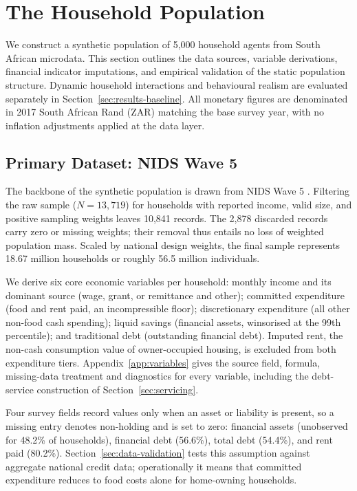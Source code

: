 \section{The Household Population}
\label{ch:population}

We construct a synthetic population of 5{,}000 household agents from South African microdata.
This section outlines the data sources, variable derivations, financial indicator imputations, and empirical validation of the static population structure.
Dynamic household interactions and behavioural realism are evaluated separately in Section~\ref{sec:results-baseline}.
All monetary figures are denominated in 2017 South African Rand (ZAR) matching the base survey year, with no inflation adjustments applied at the data layer.

\subsection{Primary Dataset: NIDS Wave 5}
\label{sec:backbone}

The backbone of the synthetic population is drawn from \ac{NIDS} Wave 5 \cite{nids_w5_2018}.
Filtering the raw sample ($N = 13,719$) for households with reported income, valid size, and
positive sampling weights leaves 10{,}841 records. The 2{,}878 discarded records carry zero or missing weights; their removal thus entails no loss of weighted population mass. Scaled by national design weights, the final sample represents 18.67 million households or roughly 56.5 million individuals.

We derive six core economic variables per household: monthly income and its dominant source (wage, grant, or remittance and other); committed expenditure (food and rent paid, an incompressible floor); discretionary expenditure (all other non-food cash spending); liquid savings (financial assets, winsorised at the 99th percentile); and traditional debt (outstanding financial debt).
Imputed rent, the non-cash consumption value of owner-occupied housing, is excluded from both expenditure tiers.
Appendix~\ref{app:variables} gives the source field, formula, missing-data treatment and diagnostics for every variable, including the debt-service construction of Section~\ref{sec:servicing}.

Four survey fields record values only when an asset or liability is present, so a missing entry denotes non-holding and is set to zero: financial assets (unobserved for 48.2\% of households), financial debt (56.6\%), total debt (54.4\%), and rent paid (80.2\%).
Section~\ref{sec:data-validation} tests this assumption against aggregate national credit data; operationally it means that committed expenditure reduces to food costs alone for home-owning households.

